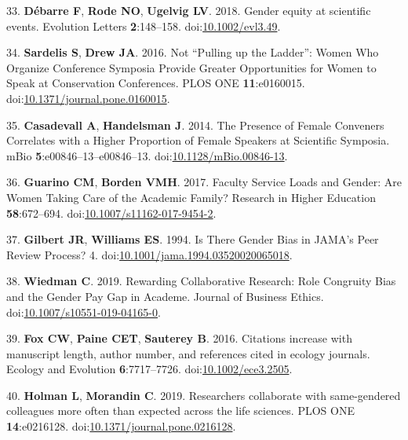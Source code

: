 \documentclass[11pt,]{article}
\begin{document}
\hypertarget{ref-debarre_gender_2018}{}
33. \textbf{Débarre F}, \textbf{Rode NO}, \textbf{Ugelvig LV}. 2018.
Gender equity at scientific events. Evolution Letters
\textbf{2}:148--158.
doi:\href{https://doi.org/10.1002/evl3.49}{10.1002/evl3.49}.

\hypertarget{ref-sardelis_not_2016}{}
34. \textbf{Sardelis S}, \textbf{Drew JA}. 2016. Not ``Pulling up the
Ladder'': Women Who Organize Conference Symposia Provide Greater
Opportunities for Women to Speak at Conservation Conferences. PLOS ONE
\textbf{11}:e0160015.
doi:\href{https://doi.org/10.1371/journal.pone.0160015}{10.1371/journal.pone.0160015}.

\hypertarget{ref-casadevall_presence_2014}{}
35. \textbf{Casadevall A}, \textbf{Handelsman J}. 2014. The Presence of
Female Conveners Correlates with a Higher Proportion of Female Speakers
at Scientific Symposia. mBio \textbf{5}:e00846--13--e00846--13.
doi:\href{https://doi.org/10.1128/mBio.00846-13}{10.1128/mBio.00846-13}.

\hypertarget{ref-guarino_faculty_2017}{}
36. \textbf{Guarino CM}, \textbf{Borden VMH}. 2017. Faculty Service
Loads and Gender: Are Women Taking Care of the Academic Family? Research
in Higher Education \textbf{58}:672--694.
doi:\href{https://doi.org/10.1007/s11162-017-9454-2}{10.1007/s11162-017-9454-2}.

\hypertarget{ref-gilbert_is_1994}{}
37. \textbf{Gilbert JR}, \textbf{Williams ES}. 1994. Is There Gender
Bias in JAMA's Peer Review Process? 4.
doi:\href{https://doi.org/10.1001/jama.1994.03520020065018}{10.1001/jama.1994.03520020065018}.

\hypertarget{ref-wiedman_rewarding_2019}{}
38. \textbf{Wiedman C}. 2019. Rewarding Collaborative Research: Role
Congruity Bias and the Gender Pay Gap in Academe. Journal of Business
Ethics.
doi:\href{https://doi.org/10.1007/s10551-019-04165-0}{10.1007/s10551-019-04165-0}.

\hypertarget{ref-fox_citations_2016}{}
39. \textbf{Fox CW}, \textbf{Paine CET}, \textbf{Sauterey B}. 2016.
Citations increase with manuscript length, author number, and references
cited in ecology journals. Ecology and Evolution \textbf{6}:7717--7726.
doi:\href{https://doi.org/10.1002/ece3.2505}{10.1002/ece3.2505}.

\hypertarget{ref-holman_researchers_2019}{}
40. \textbf{Holman L}, \textbf{Morandin C}. 2019. Researchers
collaborate with same-gendered colleagues more often than expected
across the life sciences. PLOS ONE \textbf{14}:e0216128.
doi:\href{https://doi.org/10.1371/journal.pone.0216128}{10.1371/journal.pone.0216128}.
\end{document}
